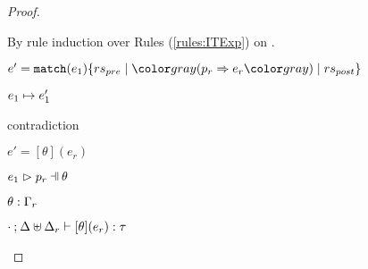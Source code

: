 \begin{proof}
\begin{byCases}
  By rule induction over Rules (\ref{rules:ITExp}) on .
  \begin{byCases}
  \item[\text{(\ref{rule:ITExpMatch})}]
    \begin{pfsteps*}
    \item $e' = \hmatch{e_1}{\zruls{rs_{pre}}{\hrulP{p_r}{e_r}}{rs_{post}}}$ 
    \item $e_1 \mapsto e_1'$  
    \item contradiction 
    \end{pfsteps*}
  
  \item[\text{(\ref{rule:ITSuccMatch})}]
    \begin{pfsteps*}
    \item $e' = [\theta](e_r)$ 
    \item $\hpatmatch{e_1}{p_r}{\theta}$  
    \item $\theta : \Gamma_r$  
    \item $\cdot \mathbin{;} \Delta \uplus \Delta_r \vdash [\theta](e_r) : \tau$ 
    \end{pfsteps*}
  

\end{byCases}
\end{byCases}
\end{proof}
